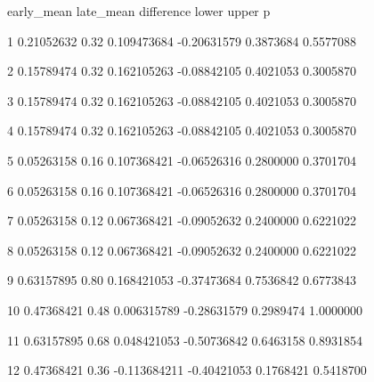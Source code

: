 \documentclass[10pt,a4paper]{article}
\begin{document}
   early\_\allowbreak{}mean late\_\allowbreak{}mean   difference       lower     upper         p\par
1  0.\allowbreak{}21052632      0.\allowbreak{}32  0.\allowbreak{}109473684 -\allowbreak{}0.\allowbreak{}20631579 0.\allowbreak{}3873684 0.\allowbreak{}5577088\par
2  0.\allowbreak{}15789474      0.\allowbreak{}32  0.\allowbreak{}162105263 -\allowbreak{}0.\allowbreak{}08842105 0.\allowbreak{}4021053 0.\allowbreak{}3005870\par
3  0.\allowbreak{}15789474      0.\allowbreak{}32  0.\allowbreak{}162105263 -\allowbreak{}0.\allowbreak{}08842105 0.\allowbreak{}4021053 0.\allowbreak{}3005870\par
4  0.\allowbreak{}15789474      0.\allowbreak{}32  0.\allowbreak{}162105263 -\allowbreak{}0.\allowbreak{}08842105 0.\allowbreak{}4021053 0.\allowbreak{}3005870\par
5  0.\allowbreak{}05263158      0.\allowbreak{}16  0.\allowbreak{}107368421 -\allowbreak{}0.\allowbreak{}06526316 0.\allowbreak{}2800000 0.\allowbreak{}3701704\par
6  0.\allowbreak{}05263158      0.\allowbreak{}16  0.\allowbreak{}107368421 -\allowbreak{}0.\allowbreak{}06526316 0.\allowbreak{}2800000 0.\allowbreak{}3701704\par
7  0.\allowbreak{}05263158      0.\allowbreak{}12  0.\allowbreak{}067368421 -\allowbreak{}0.\allowbreak{}09052632 0.\allowbreak{}2400000 0.\allowbreak{}6221022\par
8  0.\allowbreak{}05263158      0.\allowbreak{}12  0.\allowbreak{}067368421 -\allowbreak{}0.\allowbreak{}09052632 0.\allowbreak{}2400000 0.\allowbreak{}6221022\par
9  0.\allowbreak{}63157895      0.\allowbreak{}80  0.\allowbreak{}168421053 -\allowbreak{}0.\allowbreak{}37473684 0.\allowbreak{}7536842 0.\allowbreak{}6773843\par
10 0.\allowbreak{}47368421      0.\allowbreak{}48  0.\allowbreak{}006315789 -\allowbreak{}0.\allowbreak{}28631579 0.\allowbreak{}2989474 1.\allowbreak{}0000000\par
11 0.\allowbreak{}63157895      0.\allowbreak{}68  0.\allowbreak{}048421053 -\allowbreak{}0.\allowbreak{}50736842 0.\allowbreak{}6463158 0.\allowbreak{}8931854\par
12 0.\allowbreak{}47368421      0.\allowbreak{}36 -\allowbreak{}0.\allowbreak{}113684211 -\allowbreak{}0.\allowbreak{}40421053 0.\allowbreak{}1768421 0.\allowbreak{}5418700\par
\end{document}
